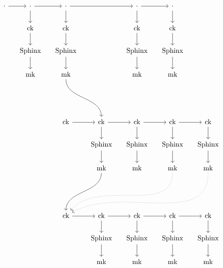 \documentclass[letterpaper]{article}
\begin{document}



\def\ck{\textrm{ck}}
\def\DH{\textrm{DH}}
\def\mk{\textrm{mk}}
\def\Sphinx{\textrm{Sphinx}}

\[\begin{tikzcd}[ampersand replacement=\&, column sep=small]
\cdot \ar[r] \& \cdot \ar[r] \ar[d] \& \cdot \ar[rr] \ar[d] \& \& \cdot \ar[r] \ar[d] \& \cdot \ar[d] \&  \& \& \\
 \& \ck \ar[d] \& \ck \ar[d] \& \& \ck \ar[d] \& \ck \ar[d] \&  \& \& \\
 \& \Sphinx \ar[d] \& \Sphinx \ar[d] \& \& \Sphinx \ar[d] \& \Sphinx\ar[d] \&  \& \& \\
 \& \mk \& \mk \ar[dddr, in=90, out=270] \& \& \mk \& \mk \&  \& \& \\
\\
\\
 \& \& \ck \ar[r] \& \ck \ar[r] \ar[d] \& \ck \ar[r] \ar[d] \& \ck \ar[r] \ar[d] \& \ck \ar[d] \&  \& \& \\
 \& \& \& \Sphinx \ar[d] \& \Sphinx \ar[d] \& \Sphinx \ar[d] \& \Sphinx\ar[d] \&  \& \& \\
 \& \& \& \mk \ar[dddl, in=90, out=270] \& \mk \& \mk \ar[dddlll, dotted, in=50, out=270] \& \mk \ar[dddllll, dotted, in=30, out=270] \&  \& \& \\
\\
\\
 \& \& \ck \ar[r] \& \ck \ar[r] \ar[d] \& \ck \ar[r] \ar[d] \& \ck \ar[r] \ar[d] \& \ck \ar[d] \&  \& \& \\
 \& \& \& \Sphinx \ar[d] \& \Sphinx \ar[d] \& \Sphinx \ar[d] \& \Sphinx\ar[d] \&  \& \& \\
 \& \& \& \mk \& \mk \& \mk \& \mk \&  \& \& \\
\end{tikzcd}\]


\end{document}
